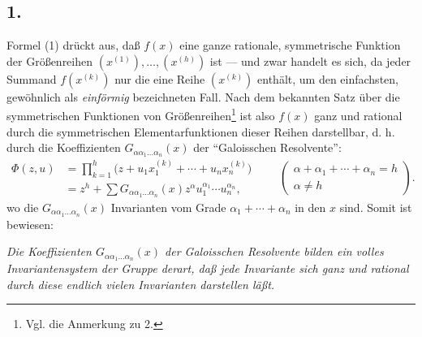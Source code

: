 \documentclass[11pt]{article}
\begin{document}
\subsection*{1.}
Formel (1) drückt aus, daß $f(x)$ eine ganze rationale, symmetrische Funktion der Größenreihen $(x^{(1)}),\ldots,(x^{(h)})$ ist --- und zwar handelt es sich, da jeder Summand $f(x^{(k)})$ nur die eine Reihe $(x^{(k)})$ enthält, um den einfachsten, gewöhnlich als \emph{einförmig} bezeichneten Fall. Nach dem bekannten Satz über die symmetrischen Funktionen von Größenreihen\footnote{Vgl. die Anmerkung zu 2.} ist also $f(x)$ ganz und rational durch die symmetrischen Elementarfunktionen dieser Reihen darstellbar, d. h. durch die Koeffizienten $G_{\alpha\alpha_1\ldots\alpha_n}(x)$ der ``Galoisschen Resolvente'':
\[
\begin{aligned}
  \Phi(z,u)
  &=\prod_{k=1}^{h}\bigl(z+u_1x_1^{(k)}+\cdots+u_nx_n^{(k)}\bigr) \\
  &=z^h+
    \sum G_{\alpha\alpha_1\ldots\alpha_n}(x)
    z^{\alpha}u_1^{\alpha_1}\cdots u_n^{\alpha_n},
\end{aligned}
\qquad
\left(\begin{array}{c}
\alpha+\alpha_1+\cdots+\alpha_n=h\\
\alpha\ne h
\end{array}\right).
\]
wo die $G_{\alpha\alpha_1\ldots\alpha_n}(x)$ Invarianten vom Grade $\alpha_1+\cdots+\alpha_n$ in den $x$ sind. Somit ist bewiesen:

\emph{Die Koeffizienten $G_{\alpha\alpha_1\ldots\alpha_n}(x)$ der Galoisschen Resolvente bilden ein volles Invariantensystem der Gruppe derart, daß jede Invariante sich ganz und rational durch diese endlich vielen Invarianten darstellen läßt.}
\end{document}
